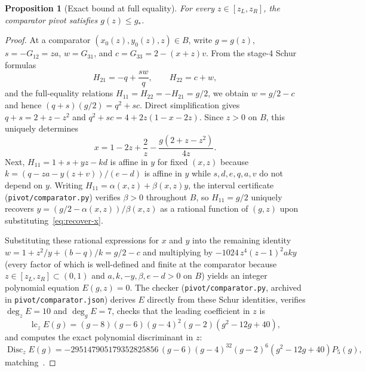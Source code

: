\documentclass[11pt]{article}
\newtheorem{proposition}[theorem]{Proposition}
\theoremstyle{remark}
\begin{document}
\begin{proposition}[Exact bound at full equality]\label{prop:comparator}
For every $z\in[z_L,z_R]$, the comparator pivot satisfies $g(z)\le g_*$.
\end{proposition}

\begin{proof}
At a comparator $(x_0(z),y_0(z),z)\in B$, write $g=g(z)$, $s=-G_{12}=za$,
$w=G_{31}$, and $c=G_{33}=2-(x+z)v$. From the stage-4 Schur formulas
\[
  H_{21} = -q + \frac{sw}{q},\qquad H_{22} = c + w,
\]
and the full-equality relations $H_{11}=H_{22}=-H_{21}=g/2$, we obtain
$w=g/2-c$ and hence $(q+s)(g/2)=q^2+sc$. Direct simplification gives
$q+s = 2+z-z^2$ and $q^2+sc = 4+2z(1-x-2z)$. Since $z>0$ on $B$, this uniquely
determines
\begin{equation}\label{eq:recover-x}
  x = 1 - 2z + \frac{2}{z} - \frac{g(2+z-z^2)}{4z}.
\end{equation}
Next, $H_{11}=1+s+yz-kd$ is affine in $y$ for fixed $(x,z)$ because
$k=(q-za-y(z+v))/(e-d)$ is affine in $y$ while $s,d,e,q,a,v$ do not depend on
$y$. Writing $H_{11}=\alpha(x,z)+\beta(x,z)y$, the interval certificate
(\texttt{pivot/comparator.py}) verifies $\beta>0$ throughout $B$, so
$H_{11}=g/2$ uniquely recovers $y=(g/2-\alpha(x,z))/\beta(x,z)$ as a rational
function of $(g,z)$ upon substituting~\eqref{eq:recover-x}.

Substituting these rational expressions for $x$ and $y$ into the remaining
identity $w = 1 + z^2/y + (b-q)/k = g/2 - c$ and multiplying by
$-1024\,z^4(z-1)^2 aky$ (every factor of which is well-defined and finite at
the comparator because $z\in[z_L,z_R]\subset(0,1)$ and $a,k,-y,\beta,e-d>0$
on $B$) yields an integer polynomial equation $E(g,z)=0$. The checker
(\texttt{pivot/comparator.py}, archived in \texttt{pivot/comparator.json})
derives $E$ directly from these Schur identities, verifies
$\deg_z E = 10$ and $\deg_g E = 7$, checks that the leading coefficient in $z$
is
\begin{equation}\label{eq:leading-z}
  \operatorname{lc}_z E(g) = (g-8)(g-6)(g-4)^2(g-2)(g^2-12g+40),
\end{equation}
and computes the exact polynomial discriminant in $z$:
\begin{equation}\label{eq:discriminant}
  \operatorname{Disc}_z E(g)
  = -295147905179352825856\,(g-6)(g-4)^{32}(g-2)^6(g^2-12g+40)P_5(g),
\end{equation}
matching~\cite[eq.~(2.14)]{CEU2026}.


\end{proof}
\end{document}
